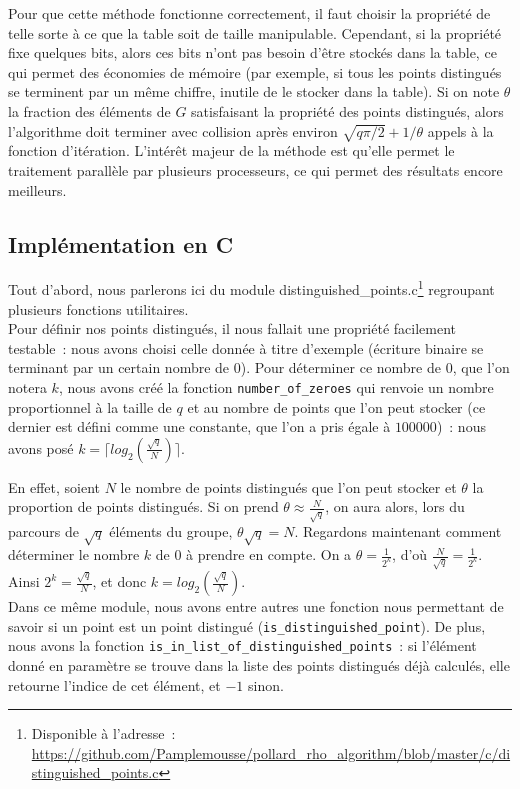       Pour que cette méthode fonctionne correctement, il faut choisir la propriété de telle sorte à ce que la table soit de taille manipulable. Cependant, si la propriété fixe quelques bits, alors ces bits n'ont pas besoin d'être stockés dans la table, ce qui permet des économies de mémoire (par exemple, si tous les points distingués se terminent par un même chiffre, inutile de le stocker dans la table). Si on note $\theta$ la fraction des éléments de $G$ satisfaisant la propriété des points distingués, alors l'algorithme doit terminer avec collision après environ $\sqrt{q\pi/2} + 1/\theta$ appels à la fonction d'itération. L'intérêt majeur de la méthode est qu'elle permet le traitement parallèle par plusieurs processeurs, ce qui permet des résultats encore meilleurs.

      \subsection{Implémentation en C}
      Tout d'abord, nous parlerons ici du module distinguished\_points.c\footnote{Disponible à l'adresse~: \url{https://github.com/Pamplemousse/pollard_rho_algorithm/blob/master/c/distinguished_points.c}} regroupant plusieurs fonctions utilitaires.\\

      Pour définir nos points distingués, il nous fallait une propriété facilement testable~: nous avons choisi celle donnée à titre d'exemple (écriture binaire se terminant par un certain nombre de $0$).
      Pour déterminer ce nombre de $0$, que l'on notera $k$, nous avons créé la fonction \lstinline{number_of_zeroes} qui renvoie un nombre proportionnel à la taille de $q$ et au nombre de points que l'on peut stocker (ce dernier est défini comme une constante, que l'on a pris égale à $100000$)~: nous avons posé $k = \lceil log_2(\frac{\sqrt{q}}{N}) \rceil $.

      En effet, soient $N$ le nombre de points distingués que l'on peut stocker et $\theta$ la proportion de points distingués. Si on prend $\theta \approx \frac{N}{\sqrt{q}}$, on aura alors, lors du parcours de $\sqrt{q}$ éléments du groupe, $\theta \sqrt{q} = N$.
      Regardons maintenant comment déterminer le nombre $k$ de $0$ à prendre en compte.
      On a $\theta = \frac{1}{2^k}$, d'où $\frac{N}{\sqrt{q}} = \frac{1}{2^k}$. Ainsi $2^k = \frac{\sqrt{q}}{N}$, et donc $k = log_2(\frac{\sqrt{q}}{N})$.\\

      Dans ce même module, nous avons entre autres une fonction nous permettant de savoir si un point est un point distingué (\lstinline{is_distinguished_point}).
      De plus, nous avons la fonction \lstinline{is_in_list_of_distinguished_points}~: si l'élément donné en paramètre se trouve dans la liste des points distingués déjà calculés, elle retourne l'indice de cet élément, et $-1$ sinon.\\

